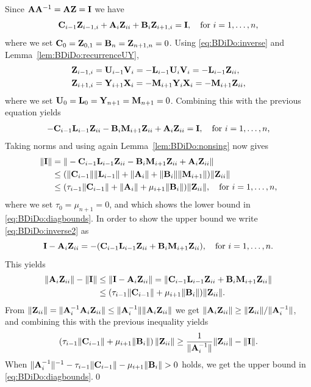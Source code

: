 Since $\mathbf{A}\mathbf{A}^{-1}=\mathbf{A}\mathbf{Z}=\mathbf{I}$ we have
\[
\mathbf{C}_{i-1}\mathbf{Z}_{i-1,i}+\mathbf{A}_i\mathbf{Z}_{ii}+\mathbf{B}_i\mathbf{Z}_{i+1,i}=\mathbf{I},\quad
\mbox{for $i=1,\dots,n$,}
\]
where we set $\mathbf{C}_0=\mathbf{Z}_{0,1}=\mathbf{B}_n=\mathbf{Z}_{n+1,n}=0$. Using \eqref{eq:BDiDo:inverse} and
Lemma~\ref{lem:BDiDo:recurrenceUY},
%
\begin{align*}
\mathbf{Z}_{i-1,i} &=\mathbf{U}_{i-1}\mathbf{V}_i=-\mathbf{L}_{i-1}\mathbf{U}_i\mathbf{V}_i=-\mathbf{L}_{i-1}\mathbf{Z}_{ii},\\
\mathbf{Z}_{i+1,i} &=\mathbf{Y}_{i+1}\mathbf{X}_{i}=-\mathbf{M}_{i+1}\mathbf{Y}_i\mathbf{X}_i=-\mathbf{M}_{i+1}\mathbf{Z}_{ii},
\end{align*}
%
where we set $\mathbf{U}_0=\mathbf{L}_0=\mathbf{Y}_{n+1}=\mathbf{M}_{n+1}=0$. Combining this with the previous
equation yields
%
\begin{equation}\label{eq:BDiDo:inverse2}
-\mathbf{C}_{i-1}\mathbf{L}_{i-1}\mathbf{Z}_{ii}-\mathbf{B}_i\mathbf{M}_{i+1}\mathbf{Z}_{ii}+\mathbf{A}_i\mathbf{Z}_{ii}=\mathbf{I},
\quad \mbox{for $i=1,\dots,n$,}
\end{equation}
%
Taking norms and using again Lemma~\ref{lem:BDiDo:nonsing} now gives
%
\begin{align*}
\|\mathbf{I}\|&=\|-\mathbf{C}_{i-1}\mathbf{L}_{i-1}\mathbf{Z}_{ii}-\mathbf{B}_i\mathbf{M}_{i+1}\mathbf{Z}_{ii}+\mathbf{A}_i\mathbf{Z}_{ii}\|\\
&\leq (\|\mathbf{C}_{i-1}\|\|\mathbf{L}_{i-1}\|+\|\mathbf{A}_i\|+\|\mathbf{B}_i\|\|\mathbf{M}_{i+1}\|)\|\mathbf{Z}_{ii}\|\\
&\leq (\tau_{i-1}\|\mathbf{C}_{i-1}\|+\|\mathbf{A}_i\|+\mu_{i+1}\|\mathbf{B}_i\|)\|\mathbf{Z}_{ii}\|, \quad\mbox{for $i=1,\dots,n$},
\end{align*}
%
where we set $\tau_0=\mu_{n+1}=0$, and which shows
the lower bound in \eqref{eq:BDiDo:diagbounds}. In order to show the upper
bound we write  \eqref{eq:BDiDo:inverse2} as
%
\begin{equation*}%
\I-\A_i\Z_{ii}= -(\C_{i-1}\L_{i-1}\Z_{ii}+\B_i\M_{i+1}\Z_{ii}),\quad \mbox{for $i=1,\dots,n$.}
\end{equation*}
%
This yields
%
\begin{align*}
\|\mathbf{A}_i\mathbf{Z}_{ii}\|-\|\mathbf{I}\| &\leq \|\mathbf{I}-\mathbf{A}_i\mathbf{Z}_{ii}\|
= \|\mathbf{C}_{i-1}\mathbf{L}_{i-1}\mathbf{Z}_{ii}+\mathbf{B}_i\mathbf{M}_{i+1}\mathbf{Z}_{ii}\| \\
 & \leq  (\tau_{i-1}\|\mathbf{C}_{i-1}\|+\mu_{i+1}\|\mathbf{B}_i\|)\|\mathbf{Z}_{ii}\|.
\end{align*}
%
From
%
$\|\mathbf{Z}_{ii}\|=\|\mathbf{A}_i^{-1}\mathbf{A}_i\mathbf{Z}_{ii}\|\leq\|\mathbf{A}_i^{-1}\|\|\mathbf{A}_i\mathbf{Z}_{ii}\|$
%
we get $\|\mathbf{A}_i\mathbf{Z}_{ii}\|\geq \|\mathbf{Z}_{ii}\|/\|\mathbf{A}_{i}^{-1}\|$,
and combining this with the previous inequality yields
%
\[\left(\tau_{i-1}\|\mathbf{C}_{i-1}\|+\mu_{i+1}\|\mathbf{B}_i\|\right)\|\mathbf{Z}_{ii}\|\geq\frac{1}{\|\mathbf{A}_{i}^{-1}\|}\|\mathbf{Z}_{ii}\|-\|\mathbf{I}\|.\]
%
When $\|\A_i^{-1}\|^{-1}-\tau_{i-1}\|\C_{i-1}\|-\mu_{i+1}\|\B_i\|>0$ holds,
we get the upper bound in \eqref{eq:BDiDo:diagbounds}.\qed \\

